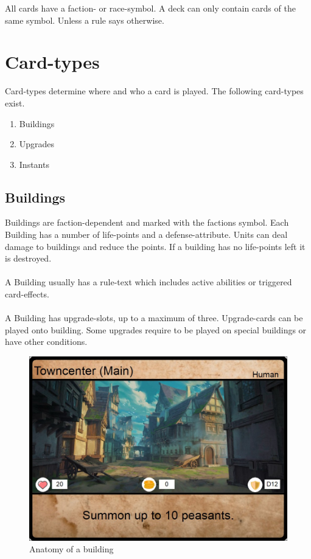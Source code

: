 \documentclass[a5paper,pagesize,10pt,bibtotoc,pointlessnumbers,
normalheadings,DIV=9,twoside=false]{scrbook}
\begin{document}
All cards have a faction- or race-symbol. A deck can only contain cards of the same symbol. Unless a rule says otherwise.

\section{Card-types}
Card-types determine where and who a card is played. The following card-types exist.

\begin{enumerate}
\item Buildings
\item Upgrades
\item Instants
\end{enumerate}

\subsection{Buildings}
Buildings are faction-dependent and marked with the factions symbol. Each Building has a number of life-points and a defense-attribute.
Units can deal damage to buildings and reduce the points. If a building has no life-points left it is destroyed.\\
\\
A Building usually has a rule-text which includes active abilities or triggered card-effects.\\
\\
A Building has upgrade-slots, up to a maximum of three.
Upgrade-cards can be played onto building. Some upgrades require to be played on special buildings or have other conditions.

\begin{figure}[t]
\includegraphics[scale=1.0]{examplebuilding}
\centering
\caption{Anatomy of a building}
\end{figure}
\end{document}
